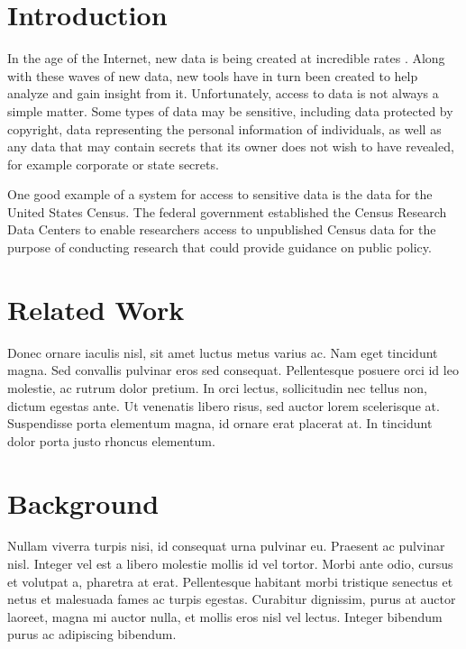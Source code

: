 \documentclass{acm_proc_article-sp}
\begin{document}

\section{Introduction}

In the age of the Internet, new data is being created at incredible rates
\cite{digital-universe}.  Along with these waves of new data, new tools have
in turn been created to help analyze and gain insight from it. Unfortunately,
access to data is not always a simple matter.  Some types of data may be
sensitive, including data protected by copyright, data representing the personal
information of individuals, as well as any data that may contain secrets that
its owner does not wish to have revealed, for example corporate or state secrets.

One good example of a system for access to sensitive data is the data for the
United States Census.  The federal government established the Census Research
Data Centers to enable researchers access to unpublished Census data for the
purpose of conducting research that could provide guidance on public policy.

\section{Related Work}
Donec ornare iaculis nisl, sit amet luctus metus varius ac. Nam eget tincidunt
magna. Sed convallis pulvinar eros sed consequat. Pellentesque posuere orci id
leo molestie, ac rutrum dolor pretium. In orci lectus, sollicitudin nec tellus
non, dictum egestas ante. Ut venenatis libero risus, sed auctor lorem
scelerisque at. Suspendisse porta elementum magna, id ornare erat placerat at.
In tincidunt dolor porta justo rhoncus elementum.

\section{Background}
Nullam viverra turpis nisi, id consequat urna pulvinar eu. Praesent ac pulvinar
nisl. Integer vel est a libero molestie mollis id vel tortor. Morbi ante odio,
cursus et volutpat a, pharetra at erat. Pellentesque habitant morbi tristique
senectus et netus et malesuada fames ac turpis egestas. Curabitur dignissim,
purus at auctor laoreet, magna mi auctor nulla, et mollis eros nisl vel lectus.
Integer bibendum purus ac adipiscing bibendum.
\end{document}
